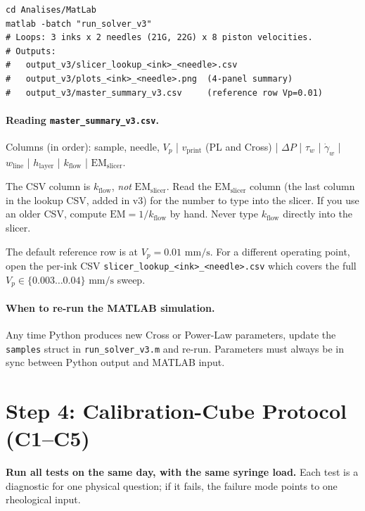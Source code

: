 \documentclass[11pt,a4paper]{article}
\newcommand{\gd}{\dot{\gamma}}
\newcommand{\mms}{\,\mathrm{mm/s}}
\begin{document}
\begin{lstlisting}[style=shell]
cd Analises/MatLab
matlab -batch "run_solver_v3"
# Loops: 3 inks x 2 needles (21G, 22G) x 8 piston velocities.
# Outputs:
#   output_v3/slicer_lookup_<ink>_<needle>.csv
#   output_v3/plots_<ink>_<needle>.png  (4-panel summary)
#   output_v3/master_summary_v3.csv     (reference row Vp=0.01)
\end{lstlisting}

\paragraph{Reading \texttt{master\_summary\_v3.csv}.}
Columns (in order): sample, needle, $V_p$ | $v_\mathrm{print}$ (PL and
Cross) | $\Delta P$ | $\tau_w$ | $\gd_w$ | $w_\mathrm{line}$ |
$h_\mathrm{layer}$ | $k_\mathrm{flow}$ | $\mathrm{EM}_\mathrm{slicer}$.

\begin{warningbox}
The CSV column is $k_\mathrm{flow}$, \emph{not}
$\mathrm{EM}_\mathrm{slicer}$. Read the $\mathrm{EM}_\mathrm{slicer}$
column (the last column in the lookup CSV, added in v3) for the number
to type into the slicer. If you use an older CSV, compute
$\mathrm{EM}=1/k_\mathrm{flow}$ by hand. Never type $k_\mathrm{flow}$
directly into the slicer.
\end{warningbox}

\begin{tipbox}
The default reference row is at $V_p=0.01\,\mms$. For a different
operating point, open the per-ink CSV
\texttt{slicer\_lookup\_<ink>\_<needle>.csv} which covers the full
$V_p\in\{0.003\ldots 0.04\}\,\mms$ sweep.
\end{tipbox}

\paragraph{When to re-run the MATLAB simulation.}
Any time Python produces new Cross or Power-Law parameters, update
the \texttt{samples} struct in \texttt{run\_solver\_v3.m} and re-run.
Parameters must always be in sync between Python output and MATLAB input.

\section{Step 4: Calibration-Cube Protocol (C1--C5)}
\label{sec:cubes}

\textbf{Run all tests on the same day, with the same syringe load.}
Each test is a diagnostic for one physical question; if it fails, the
failure mode points to one rheological input.
\end{document}
